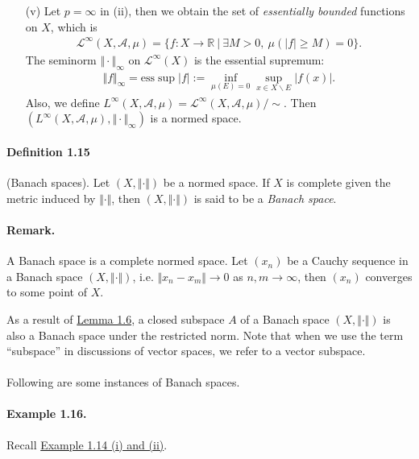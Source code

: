 \documentclass{article}
\newcommand{\esssup}{\mathrm{ess}\sup}
\begin{document}
\begin{itemize}
\item[(v)] Let $p=\infty$ in (ii), then we obtain the set of \textit{essentially bounded} functions on $X$, which is
\begin{align*}
	\mathcal{L}^\infty(X,\mathscr{A},\mu)=\{f:X\to\mathbb{R}\ |\ \exists M>0,\ \mu(\vert f\vert\geq M)=0\}.
\end{align*}
The seminorm $\Vert\cdot\Vert_\infty$ on $\mathcal{L}^\infty(X)$ is the essential supremum:
\begin{align*}
	\Vert f\Vert_\infty = \esssup\vert f\vert := \inf_{\mu(E)=0}\sup_{x\in X\backslash E} \vert f(x)\vert.
\end{align*}
Also, we define $L^\infty(X,\mathscr{A},\mu)=\mathcal{L}^\infty(X,\mathscr{A},\mu)/\sim$. Then $(L^\infty(X,\mathscr{A},\mu),\Vert\cdot\Vert_\infty)$ is a normed space.
\end{itemize}

\paragraph{Definition 1.15\label{def:1.15}} (Banach spaces). Let $(X,\Vert\cdot\Vert)$ be a normed space. If $X$ is complete given the metric induced by $\Vert\cdot\Vert$, then $(X,\Vert\cdot\Vert)$ is said to be a \textit{Banach space}.

\paragraph{Remark.} A Banach space is a complete normed space. Let $(x_n)$ be a Cauchy sequence in a Banach space $(X,\Vert\cdot\Vert)$, i.e. $\Vert x_n - x_m\Vert \to 0$ as $n,m\to\infty$, then $(x_n)$ converges to some point of $X$.

As a result of \hyperref[lemma:1.6]{Lemma 1.6}, a closed subspace $A$ of a Banach space $(X,\Vert\cdot\Vert)$ is also a Banach space under the restricted norm. Note that when we use the term ``subspace'' in discussions of vector spaces, we refer to a vector subspace.

\paragraph{} Following are some instances of Banach spaces.

\paragraph{Example 1.16.\label{example:1.16}} Recall \hyperref[example:1.14]{Example 1.14 (i) and (ii)}.
\end{document}
